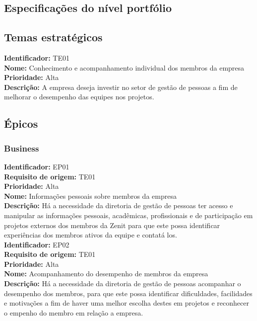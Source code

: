 \begin{anexosenv}

\partanexos

\chapter{Especificações do nível portfólio}

\section[Temas Estratégicos]{Temas estratégicos}

\textbf{Identificador:} TE01\\
\textbf{Nome:} Conhecimento e acompanhamento individual dos membros da empresa\\
\textbf{Prioridade:} Alta\\
\textbf{Descrição:} A empresa deseja investir no setor de gestão de pessoas a fim de melhorar o desempenho das equipes nos projetos.\\

\section[Épicos]{Épicos}

\subsection[Business]{Business}

\textbf{Identificador:} EP01\\
\textbf{Requisito de origem:} TE01\\
\textbf{Prioridade:} Alta\\
\textbf{Nome:} Informações pessoais sobre membros da empresa\\
\textbf{Descrição:} Há a necessidade da diretoria de gestão de pessoas ter acesso e manipular as informações pessoais, acadêmicas, profissionais e de participação em projetos externos dos membros da Zenit para que este possa identificar experiências dos membros ativos da equipe e contatá los.\\

\textbf{Identificador:} EP02\\
\textbf{Requisito de origem:} TE01\\
\textbf{Prioridade:} Alta\\
\textbf{Nome:}  Acompanhamento do desempenho de membros da empresa\\
\textbf{Descrição:} Há a necessidade da diretoria de gestão de pessoas acompanhar o desempenho dos membros, para que este possa identificar dificuldades, facilidades e motivações a fim de haver uma melhor escolha destes em projetos e reconhecer o empenho do membro em relação a empresa.\\


\end{anexosenv}
